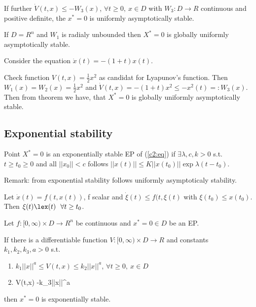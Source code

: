 If further $\dot V(t,x) \le -W_3(x)$, $\forall t\ge0,\ x\in D$ with $W_3:D \to R$
 continuous and positive definite, the $x^*=0$ is uniformly asymptotically stable.

 If $D=R^n$ and $W_1$ is radialy unbounded then $X^*=0$ is globally uniformly
 asymptotically stable.

 Consider the equation $\dot x(t) = -(1+t)x(t)$.

 Check function $V(t,x)=\frac{1}{2}x^2$ as candidat for Lyapunov's function. Then
 $W_1(x)=W_2(x)=\frac{1}{2}x^2$ and $\dot V(t,x)=-(1+t)x^2 \le -x^2(t)=: W_3(x)$.
 Then from theorem we have, that $X^*=0$  is globally uniformly asymptotically stable.


\subsection{Exponential stability}

 Point $X^*=0$ is an exponentially stable EP of (\ref{c2:eq}) if $\exists \lambda,c,k>0$
 s.t. $t \ge t_0 \ge 0$ and all $||x_0||<c$ follows
 $||x(t)||\le K||x(t_0)||\exp{\lambda(t-t_0)}$.

Remark: from exponential stability follows uniformly asymptoticaly stability.

 Let $\dot x(t)=f(t,x(t))$, f scalar and $\dot \xi(t)\le f(t, \xi(t)$ with 
 $\xi(t_0)\le x(t_0)$. Then $\xi(t)\lex(t)\ \ \forall t\ge t_0$.

 Let $f:[0, \infty)\times D \to R^n$ be continuous and $x^*=0 \in D$ be an EP.

 If there is a differentiable function $V:[0,\infty)\times D \to R$ and constants
 $k_1,k_2,k_3,a > 0$ s.t.
 \begin{enumerate}
  \item $k_1||x||^a \le V(t,x) \le k_2||x||^a$, $\forall t\ge 0, \ x\in D$
  \item \dot V(t,x) \le -k_3||x||^a
 \end{enumerate}

 then $x^*=0$ is exponentially stable.

